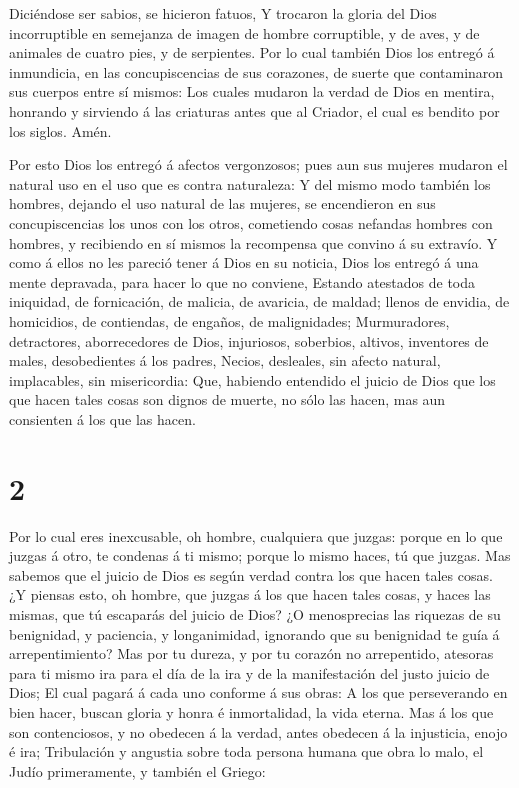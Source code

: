  Diciéndose ser sabios, se hicieron fatuos,  Y
trocaron la gloria del Dios incorruptible en semejanza de imagen de
hombre corruptible, y de aves, y de animales de cuatro pies, y de
serpientes.  Por lo cual también Dios los entregó á
inmundicia, en las concupiscencias de sus corazones, de suerte que
contaminaron sus cuerpos entre sí mismos:  Los cuales
mudaron la verdad de Dios en mentira, honrando y sirviendo á las
criaturas antes que al Criador, el cual es bendito por los siglos. Amén.

 Por esto Dios los entregó á afectos vergonzosos; pues aun
sus mujeres mudaron el natural uso en el uso que es contra naturaleza:
 Y del mismo modo también los hombres, dejando el uso
natural de las mujeres, se encendieron en sus concupiscencias los unos
con los otros, cometiendo cosas nefandas hombres con hombres, y
recibiendo en sí mismos la recompensa que convino á su extravío.
 Y como á ellos no les pareció tener á Dios en su noticia,
Dios los entregó á una mente depravada, para hacer lo que no conviene,
 Estando atestados de toda iniquidad, de fornicación, de
malicia, de avaricia, de maldad; llenos de envidia, de homicidios, de
contiendas, de engaños, de malignidades;  Murmuradores,
detractores, aborrecedores de Dios, injuriosos, soberbios, altivos,
inventores de males, desobedientes á los padres,  Necios,
desleales, sin afecto natural, implacables, sin misericordia:
 Que, habiendo entendido el juicio de Dios que los que
hacen tales cosas son dignos de muerte, no sólo las hacen, mas aun
consienten á los que las hacen.

\hypertarget{section-1}{%
\section{2}\label{section-1}}

 Por lo cual eres inexcusable, oh hombre, cualquiera que
juzgas: porque en lo que juzgas á otro, te condenas á ti mismo; porque
lo mismo haces, tú que juzgas.  Mas sabemos que el juicio de
Dios es según verdad contra los que hacen tales cosas.  ¿Y
piensas esto, oh hombre, que juzgas á los que hacen tales cosas, y haces
las mismas, que tú escaparás del juicio de Dios?  ¿O
menosprecias las riquezas de su benignidad, y paciencia, y longanimidad,
ignorando que su benignidad te guía á arrepentimiento?  Mas
por tu dureza, y por tu corazón no arrepentido, atesoras para ti mismo
ira para el día de la ira y de la manifestación del justo juicio de
Dios;  El cual pagará á cada uno conforme á sus obras:
 A los que perseverando en bien hacer, buscan gloria y honra
é inmortalidad, la vida eterna.  Mas á los que son
contenciosos, y no obedecen á la verdad, antes obedecen á la injusticia,
enojo é ira;  Tribulación y angustia sobre toda persona
humana que obra lo malo, el Judío primeramente, y también el Griego:

